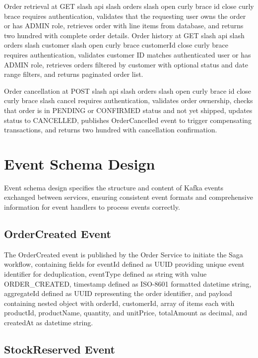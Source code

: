 Order retrieval at GET slash api slash orders slash open curly brace id close curly brace requires authentication, validates that the requesting user owns the order or has ADMIN role, retrieves order with line items from database, and returns two hundred with complete order details. Order history at GET slash api slash orders slash customer slash open curly brace customerId close curly brace requires authentication, validates customer ID matches authenticated user or has ADMIN role, retrieves orders filtered by customer with optional status and date range filters, and returns paginated order list.

Order cancellation at POST slash api slash orders slash open curly brace id close curly brace slash cancel requires authentication, validates order ownership, checks that order is in PENDING or CONFIRMED status and not yet shipped, updates status to CANCELLED, publishes OrderCancelled event to trigger compensating transactions, and returns two hundred with cancellation confirmation.

\section{Event Schema Design}

Event schema design specifies the structure and content of Kafka events exchanged between services, ensuring consistent event formats and comprehensive information for event handlers to process events correctly.

\subsection{OrderCreated Event}

The OrderCreated event is published by the Order Service to initiate the Saga workflow, containing fields for eventId defined as UUID providing unique event identifier for deduplication, eventType defined as string with value ORDER\_CREATED, timestamp defined as ISO-8601 formatted datetime string, aggregateId defined as UUID representing the order identifier, and payload containing nested object with orderId, customerId, array of items each with productId, productName, quantity, and unitPrice, totalAmount as decimal, and createdAt as datetime string.

\subsection{StockReserved Event}

